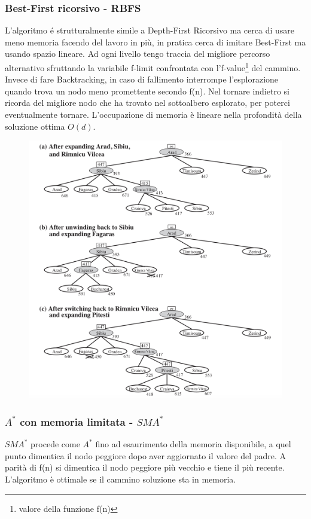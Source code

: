 \documentclass{article}
\begin{document}
\subsubsection{Best-First ricorsivo - RBFS}
L'algoritmo é strutturalmente simile a Depth-First Ricorsivo ma cerca di usare meno memoria facendo del lavoro in più, in pratica cerca di imitare Best-First ma usando spazio lineare. Ad ogni livello tengo traccia del migliore percorso alternativo sfruttando la variabile f-limit confrontata con l'f-value\footnote{valore della funzione f(n)} del cammino. Invece di fare Backtracking, in caso di fallimento interrompe l'esplorazione quando trova un nodo meno promettente secondo f(n). Nel tornare indietro si ricorda del migliore nodo che ha trovato nel sottoalbero esplorato, per poterci eventualmente tornare. L'occupazione di memoria è lineare nella profondità della soluzione ottima $O(d)$.
\begin{figure}[H]
    \centering
    \includegraphics[scale=0.5]{Images/rbfsalg.png}
\end{figure}

\subsubsection{$A^*$ con memoria limitata - $SMA^*$}
$SMA^*$ procede come $A^*$ fino ad esaurimento della memoria disponibile, a quel punto dimentica il nodo peggiore dopo aver aggiornato il valore del padre. A parità di f(n) si dimentica il nodo peggiore più vecchio e tiene il più recente. L'algoritmo è ottimale se il cammino soluzione sta in memoria.
\clearpage
\end{document}
